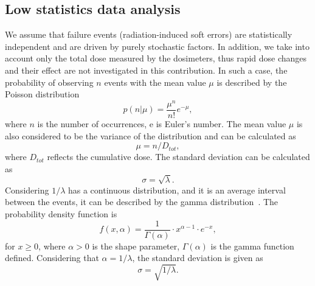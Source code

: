 \subsection{Low statistics data analysis}

We assume that failure events (radiation-induced soft errors) are statistically independent and are driven by purely stochastic factors. In addition, we take into account only the total dose measured by the dosimeters, thus rapid dose changes and their effect are not investigated in this contribution. In such a case, the probability of observing $n$ events with the mean value $\mu$ is described by the Poisson distribution\newline
\begin{equation}
    p(n|\mu) = \frac{\mu^{n}}{n!}e^{-\mu},
\end{equation}
where $n$ is the number of occurrences, e is Euler's number. The mean value $\mu$ is also considered to be the variance of the distribution and can be calculated as
\begin{equation}
    \mu = n/D_{tot},
\end{equation}
where $D_{tot}$ reflects the cumulative dose. The standard deviation can be calculated as 
\begin{equation}
    \sigma = \sqrt{\lambda}.
\end{equation}
Considering $1/\lambda$ has a continuous distribution, and it is an average interval between the events, it can be described by the gamma distribution~\cite{Gamma_1, Gamma_2}. The probability density function is 
\begin{equation}
   f(x, \alpha) = \frac{1}{{\Gamma(\alpha)}} \cdot x^{\alpha-1} \cdot e^{-x},
\end{equation}
for $x \geq 0$, where $\alpha > 0$ is the shape parameter, $\Gamma(\alpha)$ is the gamma function defined. Considering that $\alpha = 1/\lambda$, the standard deviation is given as
\begin{equation}
    \sigma = \sqrt{1/\lambda}.
\end{equation}

